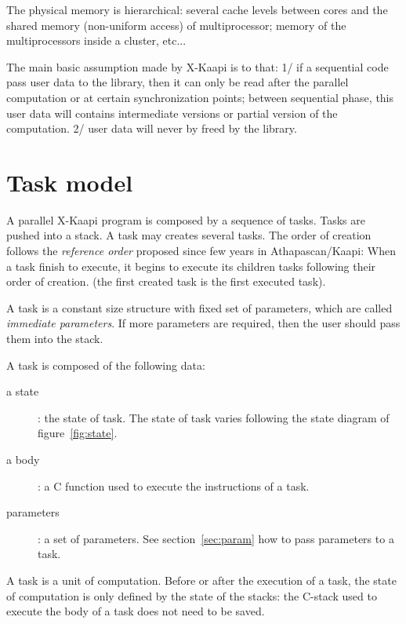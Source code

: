 \documentclass{report}
\newcommand{\kaapi}{\textsc{X}-Kaapi\xspace}
\begin{document}
The physical memory is hierarchical: several cache levels between cores and the shared memory (non-uniform access) of multiprocessor; memory of the multiprocessors inside a cluster, etc...

The main basic assumption made by \kaapi is to that: 1/ if a sequential code pass user data to the library, then it can only be read after the parallel computation or at certain synchronization points; between sequential phase, this user data will contains intermediate versions or partial version of the computation. 2/ user data will never by freed by the library.

\section{Task model}

A parallel \kaapi program is composed by a sequence of tasks. Tasks are pushed into a stack. 
A task may creates several tasks. The order of creation follows the \textit{reference order} proposed since few years in Athapascan/Kaapi: When a task finish to execute, it begins to execute its children tasks following their order of creation.
(the first created task is the first executed task).

A task is a constant size structure with fixed set of parameters, which are called \textit{immediate parameters}. If more parameters are required, then  the user should pass them into the stack. 

A task is composed of the following data:
\begin{description}
\item [a state]: the state of task. The state of task varies following the state diagram of figure~\ref{fig:state}.
\item [a body]: a C function used to execute the instructions of a task.
\item [parameters]: a set of parameters. See section~\ref{sec:param} how to pass parameters to a task.
\end{description}

A task is a unit of computation. Before or after the execution of a task, the state of computation is only defined
by the state of the stacks: the C-stack used to execute the body of a task does not need to be saved.

\end{document}
